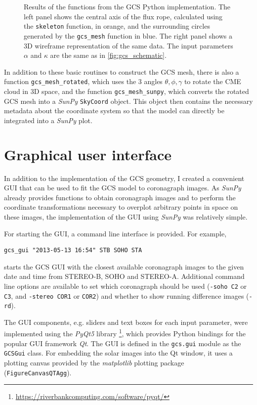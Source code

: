 \begin{figure}
	\centering
	
	\caption[Results of the functions from the \ac{GCS} Python implementation.]{Results of the functions from the \ac{GCS} Python implementation. The left panel shows the central axis of the flux rope, calculated using the \texttt{skeleton} function, in orange, and the surrounding circles generated by the \texttt{gcs\_mesh} function in blue. The right panel shows a 3D wireframe representation of the same data. The input parameters $\alpha$ and $\kappa$ are the same as in \autoref{fig:gcs_schematic}.}
	\label{fig:gcs_geometry}
\end{figure}

In addition to these basic routines to construct the \ac{GCS} mesh, there is also a function \verb|gcs_mesh_rotated|, which uses the 3 angles $\theta, \phi, \gamma$ to rotate the \ac{CME} cloud in 3D space, and the function \verb|gcs_mesh_sunpy|, which converts the rotated \ac{GCS} mesh into a \textit{SunPy} \texttt{SkyCoord} object. This object then contains the necessary metadata about the coordinate system so that the model can directly be integrated into a \textit{SunPy} plot.

\section{Graphical user interface}

In addition to the implementation of the \ac{GCS} geometry, I created a convenient \ac{GUI} that can be used to fit the \ac{GCS} model to coronagraph images. As \textit{SunPy} already provides functions to obtain coronagraph images and to perform the coordinate transformations necessary to overplot arbitrary points in space on these images, the implementation of the \ac{GUI} using \textit{SunPy} was relatively simple.

For starting the \ac{GUI}, a command line interface is provided. For example,
\begin{verbatim}
gcs_gui "2013-05-13 16:54" STB SOHO STA
\end{verbatim}
starts the \ac{GCS} \ac{GUI} with the closest available coronagraph images to the given date and time from \ac{STEREO}-B, \ac{SOHO} and \ac{STEREO}-A. Additional command line options are available to set which coronagraph should be used (\texttt{-soho C2} or \texttt{C3}, and \texttt{-stereo COR1} or \texttt{COR2}) and whether to show running difference images (\texttt{-rd}).

The \ac{GUI} components, e.g. sliders and text boxes for each input parameter, were implemented using the \textit{PyQt5} library \footnote{\url{https://riverbankcomputing.com/software/pyqt/}}, which provides Python bindings for the popular \ac{GUI} framework \textit{Qt}. The \ac{GUI} is defined in the \texttt{gcs.gui} module as the \texttt{GCSGui} class. For embedding the solar images into the Qt window, it uses a plotting canvas provided by the \textit{matplotlib} plotting package (\texttt{FigureCanvasQTAgg}).

